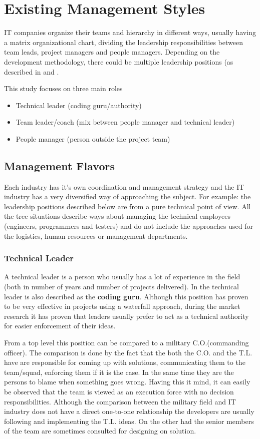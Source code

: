 \chapter{Existing Management Styles}
\label{chapter:existing}
IT companies  organize their teams and hierarchy in different ways, usually having a matrix organizational chart, dividing the leadership responsibilities between team leads, project managers and people managers. Depending on the development methodology, there could be multiple leadership positions (as described in \cite{abur-tl} and \cite{abur-pm}.

This study focuses on three main roles
\begin{itemize}
\item Technical leader (coding guru/authority)
\item Team leader/coach (mix between people manager and technical leader)
\item People manager (person outside the project team)

\end{itemize}
\section{Management Flavors}
\label{sec:flavours}
Each industry has it's own coordination and management strategy and the IT industry has a very diversified way of approaching the subject. For example: the leadership positions described below are from a pure technical point of view. All the tree situations describe ways about managing the technical employees (engineers, programmers and testers) and do not include the approaches used for the logistics, human resources or management departments.

\subsection{Technical Leader}
\label{sub-sec:tech-lead}
A technical leader is a person who usually has a lot of experience in the field (both in number of years and number of projects delivered). In \cite{abur-tl} the technical leader is also described as the \textbf{coding guru}. Although this position has proven to be very effective in projects using a waterfall approach, during the market research it has proven that leaders usually prefer to act as a technical authority for easier enforcement of their ideas.

From a top level this position can be compared to a military C.O.(commanding officer). The comparison is done by the fact that the both the C.O. and the T.L. have are responsible for coming up with solutions, communicating them to the team/squad, enforcing them if it is the case. In the same time they are the persons to blame when something goes wrong. Having this it mind, it can easily be observed that the team is viewed as an execution force with no decision responsibilities.  Although the comparison between the military field and IT industry does not have a direct one-to-one relationship the developers are usually following and implementing the T.L. ideas. On the other had the senior members of the team are sometimes consulted for designing on solution.

